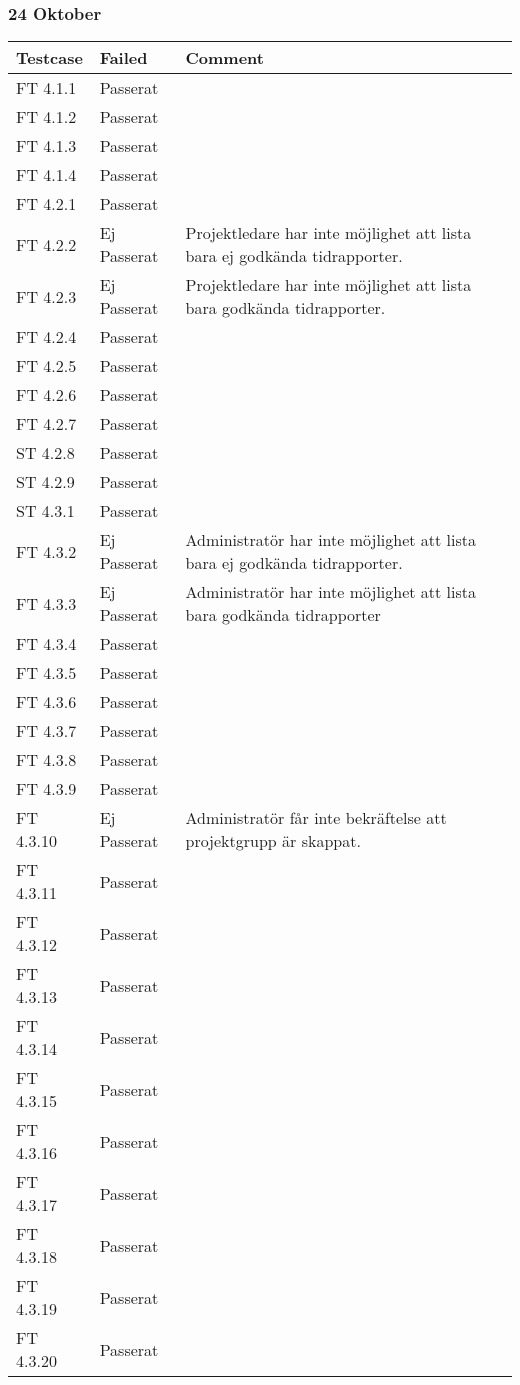 \documentclass[a4paper]{article}
\begin{document}
\subsubsection{24 Oktober}
\begin{tabular}{| l | l | p{11cm} |}
\hline
Testcase &  Failed & Comment\\
\hline
FT 4.1.1 & Passerat & \\
\hline
FT 4.1.2 & Passerat & \\
\hline
FT 4.1.3 & Passerat & \\
\hline
FT 4.1.4 & Passerat & \\
\hline
FT 4.2.1 & Passerat & \\
\hline
FT 4.2.2 & Ej Passerat & Projektledare har inte möjlighet att lista bara ej godkända tidrapporter.\\
\hline
FT 4.2.3 & Ej Passerat & Projektledare har inte möjlighet att lista bara godkända tidrapporter.\\
\hline
FT 4.2.4 & Passerat & \\
\hline
FT 4.2.5 & Passerat & \\
\hline
FT 4.2.6 & Passerat & \\
\hline
FT 4.2.7 & Passerat & \\
\hline
ST 4.2.8 & Passerat & \\
\hline
ST 4.2.9 & Passerat & \\
\hline
ST 4.3.1 & Passerat & \\
\hline
FT 4.3.2 & Ej Passerat & Administratör har inte möjlighet att lista bara ej godkända tidrapporter. \\
\hline
FT 4.3.3 & Ej Passerat & Administratör har inte möjlighet att lista bara godkända tidrapporter\\
\hline
FT 4.3.4 & Passerat & \\
\hline
FT 4.3.5 & Passerat & \\
\hline
FT 4.3.6 & Passerat & \\
\hline
FT 4.3.7 & Passerat & \\
\hline
FT 4.3.8 & Passerat & \\
\hline
FT 4.3.9 & Passerat & \\
\hline
FT 4.3.10 & Ej Passerat & Administratör får inte bekräftelse att projektgrupp är skappat. \\
\hline
FT 4.3.11 & Passerat & \\
\hline
FT 4.3.12 & Passerat & \\
\hline
FT 4.3.13 & Passerat & \\
\hline
FT 4.3.14 & Passerat & \\
\hline
FT 4.3.15 & Passerat & \\
\hline
FT 4.3.16 & Passerat & \\
\hline
FT 4.3.17 & Passerat & \\
\hline
FT 4.3.18 & Passerat & \\
\hline
FT 4.3.19 & Passerat & \\
\hline
FT 4.3.20 & Passerat & \\
\hline
\end{tabular}
\end{document}
